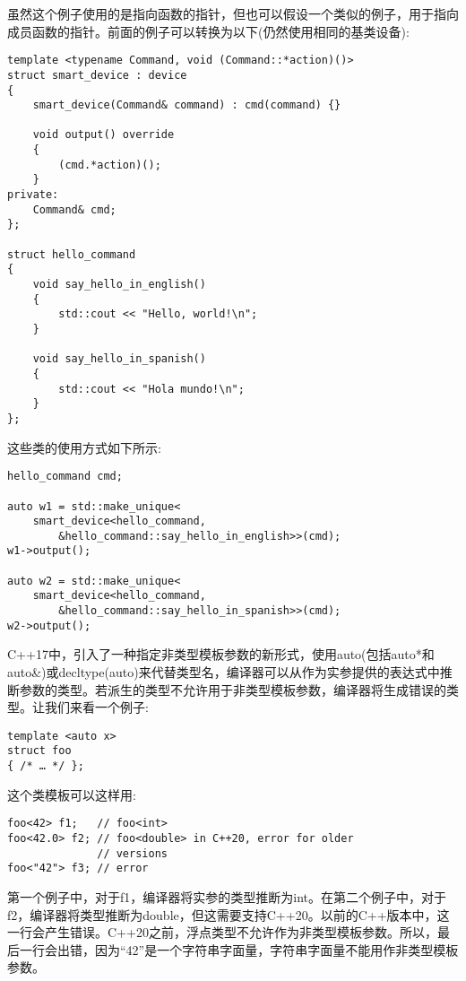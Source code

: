 虽然这个例子使用的是指向函数的指针，但也可以假设一个类似的例子，用于指向成员函数的指针。前面的例子可以转换为以下(仍然使用相同的基类设备):

\begin{lstlisting}[style=styleCXX]
template <typename Command, void (Command::*action)()>
struct smart_device : device
{
	smart_device(Command& command) : cmd(command) {}
	
	void output() override
	{
		(cmd.*action)();
	}
private:
	Command& cmd;
};

struct hello_command
{
	void say_hello_in_english()
	{
		std::cout << "Hello, world!\n";
	}

	void say_hello_in_spanish()
	{
		std::cout << "Hola mundo!\n";
	}
};
\end{lstlisting}

这些类的使用方式如下所示:

\begin{lstlisting}[style=styleCXX]
hello_command cmd;

auto w1 = std::make_unique<
	smart_device<hello_command,
		&hello_command::say_hello_in_english>>(cmd);
w1->output();

auto w2 = std::make_unique<
	smart_device<hello_command,
		&hello_command::say_hello_in_spanish>>(cmd);
w2->output();
\end{lstlisting}

C++17中，引入了一种指定非类型模板参数的新形式，使用auto(包括auto*和auto\&)或decltype(auto)来代替类型名，编译器可以从作为实参提供的表达式中推断参数的类型。若派生的类型不允许用于非类型模板参数，编译器将生成错误的类型。让我们来看一个例子:

\begin{lstlisting}[style=styleCXX]
template <auto x>
struct foo
{ /* … */ };
\end{lstlisting}

这个类模板可以这样用:

\begin{lstlisting}[style=styleCXX]
foo<42> f1;   // foo<int>
foo<42.0> f2; // foo<double> in C++20, error for older
              // versions
foo<"42"> f3; // error
\end{lstlisting}

第一个例子中，对于f1，编译器将实参的类型推断为int。在第二个例子中，对于f2，编译器将类型推断为double，但这需要支持C++20。以前的C++版本中，这一行会产生错误。C++20之前，浮点类型不允许作为非类型模板参数。所以，最后一行会出错，因为“42”是一个字符串字面量，字符串字面量不能用作非类型模板参数。


